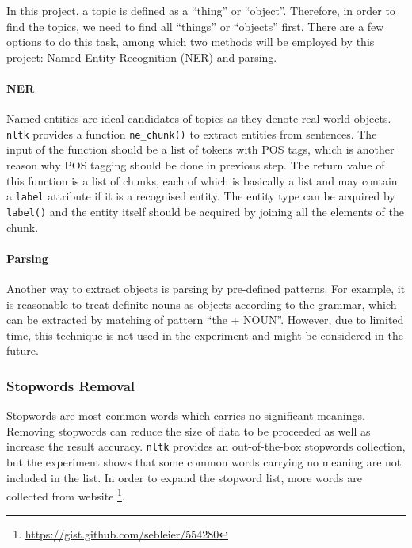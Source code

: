 \documentclass[conference]{IEEEtran}
\begin{document}
In this project, a topic is defined as a ``thing'' or ``object''.
Therefore, in order to find the topics, we need to find all ``things''
or ``objects'' first. There are a few options to do this task, among
which two methods will be employed by this project: Named Entity
Recognition (NER) and parsing.

\hypertarget{ner}{%
\paragraph{NER}\label{ner}}

Named entities are ideal candidates of topics as they denote real-world
objects. \texttt{nltk} provides a function \texttt{ne\_chunk()} to
extract entities from sentences. The input of the function should be a
list of tokens with POS tags, which is another reason why POS tagging
should be done in previous step. The return value of this function is a
list of chunks, each of which is basically a list and may contain a
\texttt{label} attribute if it is a recognised entity. The entity type
can be acquired by \texttt{label()} and the entity itself should be
acquired by joining all the elements of the chunk.

\hypertarget{parsing}{%
\paragraph{Parsing}\label{parsing}}

Another way to extract objects is parsing by pre-defined patterns. For
example, it is reasonable to treat definite nouns as objects according
to the grammar, which can be extracted by matching of pattern ``the +
NOUN''. However, due to limited time, this technique is not used in the
experiment and might be considered in the future.

\hypertarget{stopwords-removal}{%
\subsubsection{Stopwords Removal}\label{stopwords-removal}}

Stopwords are most common words which carries no significant meanings.
Removing stopwords can reduce the size of data to be proceeded as well
as increase the result accuracy. \texttt{nltk} provides an
out-of-the-box stopwords collection, but the experiment shows that some
common words carrying no meaning are not included in the list. In order
to expand the stopword list, more words are collected from website
\footnote{\url{https://gist.github.com/sebleier/554280}}.
\end{document}
